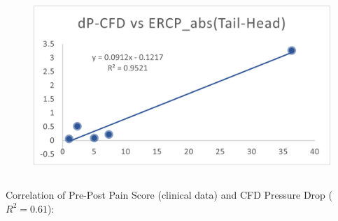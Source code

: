 \documentclass{beamer}
\begin{document}
\begin{frame}
\begin{columns}
\begin{column}{0.5\textwidth}
            \begin{figure}[H]
                \centering
                \includegraphics[width=\textwidth]{figures/Result_ERCP.png}
            \end{figure}
        \end{column}
    \end{columns}

    \vspace{0.02\textwidth}


    Correlation of Pre-Post Pain Score (clinical data) and CFD Pressure Drop ($R^2=0.61$):

    \vspace{-0.03\textwidth}





    \begin{columns}
        \begin{column}{0.4\textwidth}

            \begin{table}[h!]
                \centering
                \renewcommand{\arraystretch}{1.3} %
                \setlength{\tabcolsep}{10pt} %
                

\end{table}
\end{column}
\end{columns}
\end{frame}
\end{document}
